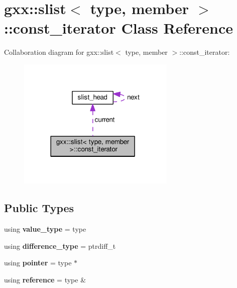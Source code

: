 \hypertarget{classgxx_1_1slist_1_1const__iterator}{}\section{gxx\+:\+:slist$<$ type, member $>$\+:\+:const\+\_\+iterator Class Reference}
\label{classgxx_1_1slist_1_1const__iterator}


Collaboration diagram for gxx\+:\+:slist$<$ type, member $>$\+:\+:const\+\_\+iterator\+:
\nopagebreak
\begin{figure}[H]
\begin{center}
\leavevmode
\includegraphics[width=213pt]{classgxx_1_1slist_1_1const__iterator__coll__graph}
\end{center}
\end{figure}
\subsection*{Public Types}
\begin{DoxyCompactItemize}
\item 
using {\bfseries value\+\_\+type} = type\hypertarget{classgxx_1_1slist_1_1const__iterator_a61d5f20481475a45a99c2936e573c445}{}\label{classgxx_1_1slist_1_1const__iterator_a61d5f20481475a45a99c2936e573c445}

\item 
using {\bfseries difference\+\_\+type} = ptrdiff\+\_\+t\hypertarget{classgxx_1_1slist_1_1const__iterator_ac519aa98365df7f3db71f9bd1b4997b1}{}\label{classgxx_1_1slist_1_1const__iterator_ac519aa98365df7f3db71f9bd1b4997b1}

\item 
using {\bfseries pointer} = type $\ast$\hypertarget{classgxx_1_1slist_1_1const__iterator_a3a134bb519f5a5bec184e701dbf1a7a6}{}\label{classgxx_1_1slist_1_1const__iterator_a3a134bb519f5a5bec184e701dbf1a7a6}

\item 
using {\bfseries reference} = type \&\hypertarget{classgxx_1_1slist_1_1const__iterator_a148e080572b609687c5cf215152165a4}{}\label{classgxx_1_1slist_1_1const__iterator_a148e080572b609687c5cf215152165a4}

\end{DoxyCompactItemize}
